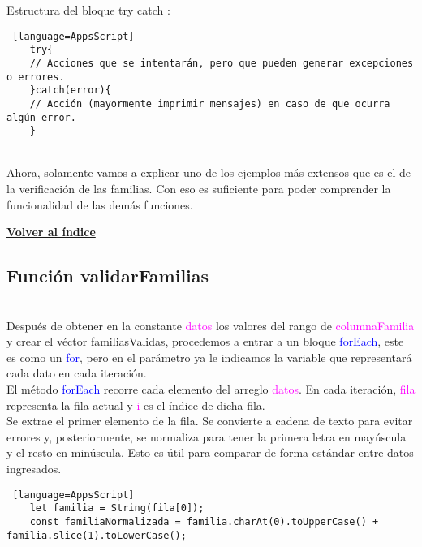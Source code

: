 \documentclass[12pt]{article} %
\begin{document}
    Estructura del bloque try catch :

    \begin{lstlisting} [language=AppsScript]
    try{
    // Acciones que se intentarán, pero que pueden generar excepciones o errores.
    }catch(error){
    // Acción (mayormente imprimir mensajes) en caso de que ocurra algún error.
    }
    \end{lstlisting} \\


    Ahora, solamente vamos a explicar uno de los ejemplos más extensos que es el de la verificación de las familias. Con eso es suficiente para poder comprender la funcionalidad de las demás funciones.
    
    


    \begin{flushright}
        \hyperlink{toc}{\textbf{Volver al índice}}
    \end{flushright}




    \subsection*{Función validarFamilias}
    \\

    Después de obtener en la constante \textcolor{magenta}{datos} los valores del rango de \textcolor{magenta}{columnaFamilia} y crear el véctor familiasValidas, procedemos a entrar a un bloque \textcolor{blue}{forEach}, este es como un \textcolor{blue}{for}, pero en el parámetro ya le indicamos la variable que representará cada dato en cada iteración.\\
    
    El método \textcolor{blue}{forEach} recorre cada elemento del arreglo \textcolor{magenta}{datos}. En cada iteración, \textcolor{magenta}{fila} representa la fila actual y \textcolor{magenta}{i} es el índice de dicha fila.\\

    Se extrae el primer elemento de la fila. Se convierte a cadena de texto para evitar errores y, posteriormente, se normaliza para tener la primera letra en mayúscula y el resto en minúscula. Esto es útil para comparar de forma estándar entre datos ingresados.\\

    \begin{lstlisting} [language=AppsScript]
    let familia = String(fila[0]);
    const familiaNormalizada = familia.charAt(0).toUpperCase() + familia.slice(1).toLowerCase();
    \end{lstlisting} \\
\end{document}

